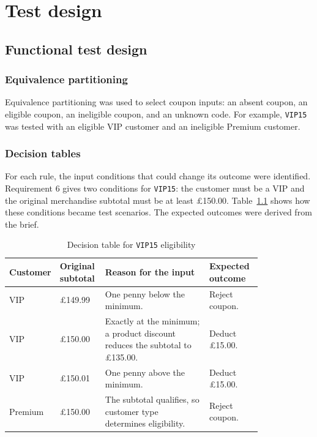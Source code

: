 \chapter{Test design}
\label{chap:design}

\section{Functional test design}
\subsection{Equivalence partitioning}
Equivalence partitioning was used to select coupon inputs: an absent
coupon, an eligible coupon, an ineligible coupon, and an unknown code.
For example, \texttt{VIP15} was tested with an eligible VIP customer
and an ineligible Premium customer.

\subsection{Decision tables}
For each rule, the input conditions that could change its outcome were
identified. Requirement 6 gives two conditions for \texttt{VIP15}: the
customer must be a VIP and the original merchandise subtotal must be at
least \pounds150.00. Table~\ref{tab:vip15-decisions} shows how these
conditions became test scenarios. The expected outcomes were derived
from the brief.

\begin{table}[htbp]
    \centering
    \caption{Decision table for \texttt{VIP15} eligibility}
    \label{tab:vip15-decisions}
    \small
    \begin{tabular}{@{}lp{0.18\linewidth}p{0.43\linewidth}p{0.21\linewidth}@{}}
        \toprule
        Customer & Original subtotal & Reason for the input & Expected outcome \\
        \midrule
        VIP & \pounds149.99 & One penny below the minimum. & Reject coupon. \\
        VIP & \pounds150.00 & Exactly at the minimum; a product discount
            reduces the subtotal to \pounds135.00. & Deduct \pounds15.00. \\
        VIP & \pounds150.01 & One penny above the minimum. & Deduct \pounds15.00. \\
        Premium & \pounds150.00 & The subtotal qualifies, so customer type
            determines eligibility. & Reject coupon. \\
        \bottomrule
    \end{tabular}
\end{table}

